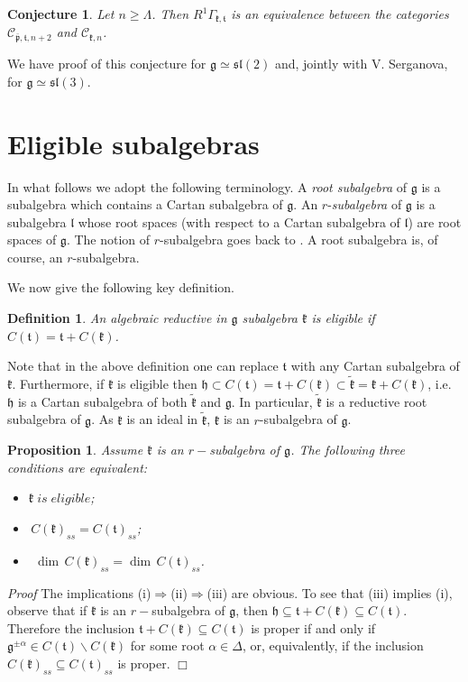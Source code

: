 \documentclass[10pt]{amsart}
\newtheorem{prop}[theo]{Proposition}
\newtheorem{conject}[theo]{Conjecture}
\renewenvironment{proof}{ \emph{Proof}}{$\Box$}
\newtheorem{defi}[theo]{Definition}
\renewcommand{\gg}{\mathfrak{g}}
\newcommand{\hh}{\mathfrak{h}}
\newcommand{\kk}{\mathfrak{k}}
\renewcommand{\ll}{\mathfrak{l}}
\newcommand{\pp}{\mathfrak{p}}
\renewcommand{\tt}{\mathfrak{t}}
\renewcommand{\sl}{\mathfrak{sl}}
\begin{document}
\begin{conject}\label{conj:1} 
 Let $n \geq \Lambda$. Then $R^{1}\Gamma_{\kk,\tt}$ is an equivalence between the categories $\mathcal{C}_{\bar{\pp},\tt,n+2}$ and $\mathcal{C}_{\kk,n}$.
\end{conject}

 We have proof of this conjecture for $\gg \simeq \sl(2)$ and, jointly with V. Serganova, for $\gg \simeq \sl(3)$.

\section{Eligible subalgebras}\label{sect:4}

In what follows we adopt the following terminology. A \textit{root subalgebra} of $\gg$ is a subalgebra which contains a Cartan subalgebra of $\gg$. An $r$-\textit{subalgebra} of $\gg$ is a subalgebra $\ll$ whose root spaces (with respect to a Cartan subalgebra of $\ll$) are root spaces of $\gg$. The notion of $r$-subalgebra goes back to \cite{D}. A root subalgebra is, of course, an $r$-subalgebra.

We now give the following key definition.

\begin{defi}\label{def:2}
    An algebraic reductive in $\gg$ subalgebra $\kk$ is eligible if $C(\tt)=\tt+C(\kk)$.
\end{defi}

Note that in the above definition one can replace $\tt$ with any Cartan subalgebra of $\kk$. Furthermore, if $\kk$ is eligible then $\hh\subset C(\tt)=\tt+C(\kk)\subset\tilde{\kk}=\kk+C(\kk)$, i.e. $\hh$ is a Cartan subalgebra of both $\tilde{\kk}$ and $\gg$. In particular, $\tilde{\kk}$ is a reductive root subalgebra of $\gg$. As $\kk$ is an ideal in $\tilde{\kk}$, $\kk$ is an $r$-subalgebra of $\gg$.

\begin{prop}\label{prop:4}
 Assume $\kk$ is an $r-$subalgebra of $\gg$. The following three conditions are equivalent:
\begin{itemize}
  \item[(i)] $\kk\;is\;eligible$;
  \item[(ii)] $\,C(\kk)_{ss} = C(\tt)_{ss}$; 
  \item[(iii)] $\;\,\dim\,C(\kk)_{ss} = \dim\,C(\tt)_{ss}$.
\end{itemize}
\end{prop}

\begin{proof}
 The implications (i)$\Rightarrow$(ii)$\Rightarrow$(iii) are obvious. To see that (iii) implies (i), observe that if $\kk$ is an $r-$subalgebra of $\gg$, then $\hh \subseteq \tt + C(\kk) \subseteq C(\tt)$. Therefore the inclusion $\tt + C(\kk) \subseteq C(\tt)$ is proper if and only if $\gg^{\pm\alpha}\in C(\tt)\backslash C(\kk)$ for some root $\alpha \in \Delta$, or, equivalently, if the inclusion $C(\kk)_{ss} \subseteq C(\tt)_{ss}$ is proper.
\end{proof}
\end{document}
